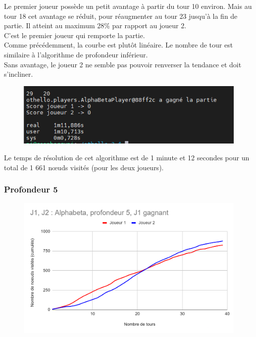 \documentclass[12pt]{article}
\begin{document}
Le premier joueur possède un petit avantage à partir du tour 10 environ. Mais au tour 18 cet avantage se réduit, pour réaugmenter au tour 23 jusqu'à la fin de partie. Il atteint au maximum 28\% par rapport au joueur 2.\\
C'est le premier joueur qui remporte la partie.\\

Comme précédemment, la courbe est plutôt linéaire. Le nombre de tour est similaire à l'algorithme de profondeur inférieur.\\
Sans avantage, le joueur 2 ne semble pas pouvoir renverser la tendance et doit s'incliner.

\begin{figure}[!h]
   \includegraphics[width=\textwidth]{prof4alphabeta-console.png}
\end{figure}

Le temps de résolution de cet algorithme est de 1 minute et 12 secondes pour un total de 1 661 nœuds visités (pour les deux joueurs).

\subsubsection{Profondeur 5}

\begin{figure}[!h]
   \includegraphics[width=\textwidth]{prof5alphabeta.png}
\end{figure}
\end{document}
